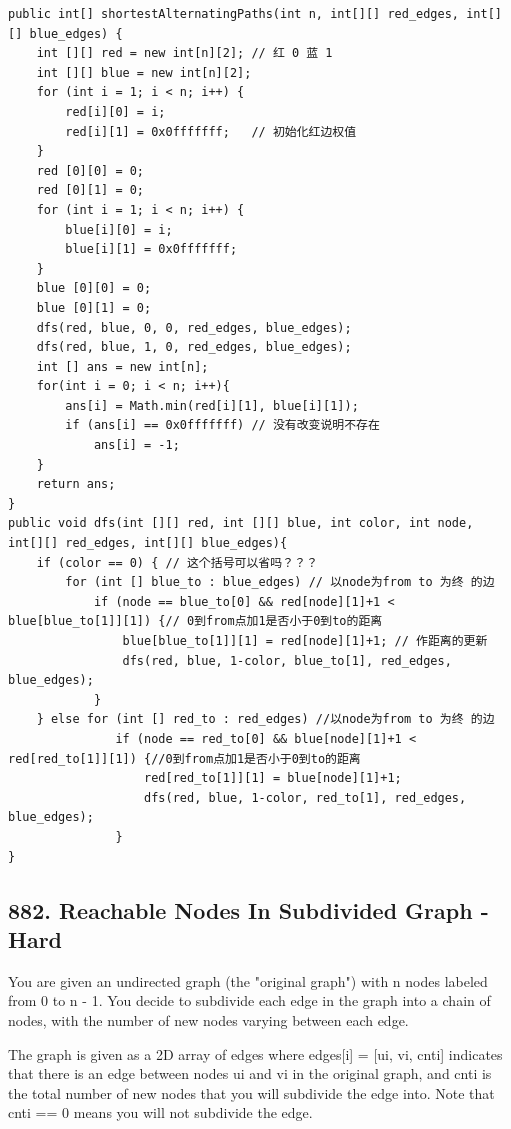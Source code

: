 \documentclass[9pt, b5paaper]{book}
\begin{document}
\begin{verbatim}
public int[] shortestAlternatingPaths(int n, int[][] red_edges, int[][] blue_edges) {
    int [][] red = new int[n][2]; // 红 0 蓝 1
    int [][] blue = new int[n][2];
    for (int i = 1; i < n; i++) {
        red[i][0] = i;
        red[i][1] = 0x0fffffff;   // 初始化红边权值
    }
    red [0][0] = 0;
    red [0][1] = 0;
    for (int i = 1; i < n; i++) {
        blue[i][0] = i;
        blue[i][1] = 0x0fffffff;
    }
    blue [0][0] = 0;
    blue [0][1] = 0;
    dfs(red, blue, 0, 0, red_edges, blue_edges);
    dfs(red, blue, 1, 0, red_edges, blue_edges);
    int [] ans = new int[n];
    for(int i = 0; i < n; i++){
        ans[i] = Math.min(red[i][1], blue[i][1]);
        if (ans[i] == 0x0fffffff) // 没有改变说明不存在
            ans[i] = -1;
    }
    return ans;
}
public void dfs(int [][] red, int [][] blue, int color, int node, int[][] red_edges, int[][] blue_edges){
    if (color == 0) { // 这个括号可以省吗？？？
        for (int [] blue_to : blue_edges) // 以node为from to 为终 的边
            if (node == blue_to[0] && red[node][1]+1 < blue[blue_to[1]][1]) {// 0到from点加1是否小于0到to的距离
                blue[blue_to[1]][1] = red[node][1]+1; // 作距离的更新
                dfs(red, blue, 1-color, blue_to[1], red_edges, blue_edges);
            }
    } else for (int [] red_to : red_edges) //以node为from to 为终 的边
               if (node == red_to[0] && blue[node][1]+1 < red[red_to[1]][1]) {//0到from点加1是否小于0到to的距离
                   red[red_to[1]][1] = blue[node][1]+1;
                   dfs(red, blue, 1-color, red_to[1], red_edges, blue_edges);
               }
}
\end{verbatim}

\subsection{882. Reachable Nodes In Subdivided Graph - Hard}
\label{sec-1-1-6}
You are given an undirected graph (the "original graph") with n nodes labeled from 0 to n - 1. You decide to subdivide each edge in the graph into a chain of nodes, with the number of new nodes varying between each edge.

The graph is given as a 2D array of edges where edges[i] = [ui, vi, cnti] indicates that there is an edge between nodes ui and vi in the original graph, and cnti is the total number of new nodes that you will subdivide the edge into. Note that cnti == 0 means you will not subdivide the edge.
\end{document}
